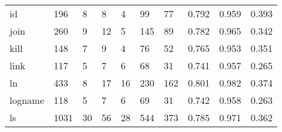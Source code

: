 \begin{longtable}{lp{1.3cm}p{1.3cm}p{1.3cm}p{1.3cm}p{1.3cm}p{1.3cm}p{1.3cm}p{1.3cm}p{1.3cm}}
id        &                    196 &                                  8 &                                 8 &                                4 &                                99 &                              77 &                                   0.792 &                                  0.959 &                                0.393 \\
join      &                    260 &                                  9 &                                12 &                                5 &                               145 &                              89 &                                   0.782 &                                  0.965 &                                0.342 \\
kill      &                    148 &                                  7 &                                 9 &                                4 &                                76 &                              52 &                                   0.765 &                                  0.953 &                                0.351 \\
link      &                    117 &                                  5 &                                 7 &                                6 &                                68 &                              31 &                                   0.741 &                                  0.957 &                                0.265 \\
ln        &                    433 &                                  8 &                                17 &                               16 &                               230 &                             162 &                                   0.801 &                                  0.982 &                                0.374 \\
logname   &                    118 &                                  5 &                                 7 &                                6 &                                69 &                              31 &                                   0.742 &                                  0.958 &                                0.263 \\
ls        &                   1031 &                                 30 &                                56 &                               28 &                               544 &                             373 &                                   0.785 &                                  0.971 &                                0.362 \\

\end{longtable}
